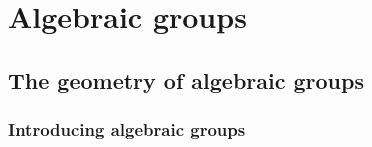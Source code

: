 \chapter{Algebraic groups}
    \begin{abstract}
        
    \end{abstract}
    
    \minitoc
    
    \section{The geometry of algebraic groups}
        \subsection{Introducing algebraic groups} \label{subsubsection: algebraic_groups}

